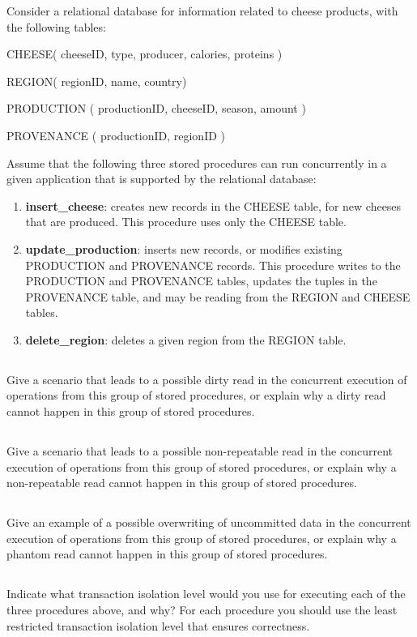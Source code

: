 {\color{gray}Consider a relational database for information related to cheese products, with the following tables:

\tab CHEESE( cheeseID, type, producer, calories, proteins )

\tab REGION( regionID, name, country)

\tab PRODUCTION ( productionID, cheeseID, season, amount )

\tab PROVENANCE ( productionID, regionID )

Assume that the following three stored procedures can run concurrently in a given application that is supported by the relational database:
\begin{enumerate}

	\item \textbf{insert\_cheese}: creates new records in the CHEESE table, for new cheeses that are produced. This procedure uses only the CHEESE table.

	\item \textbf{update\_production}: inserts new records, or modifies existing PRODUCTION and PROVENANCE records. This procedure writes to the PRODUCTION and PROVENANCE tables, updates the tuples in the PROVENANCE table, and may be reading from the REGION and CHEESE tables.

	\item \textbf{delete\_region}: deletes a given region from the REGION table.

\end{enumerate}
}

\subsection{}
{\color{gray}Give a scenario that leads to a possible dirty read in the concurrent execution of operations from this group of stored procedures, or explain why a dirty read cannot happen in this group of stored procedures.}

\subsection{}
{\color{gray}Give a scenario that leads to a possible non-repeatable read in the concurrent execution of operations from this group of stored procedures, or explain why a non-repeatable read cannot happen in this group of stored procedures.}

\subsection{}
{\color{gray}Give an example of a possible overwriting of uncommitted data in the concurrent execution of operations from this group of stored procedures, or explain why a phantom read cannot happen in this group of stored procedures.}

\subsection{}
{\color{gray}Indicate what transaction isolation level would you use for executing each of the three procedures above, and why? For each procedure you should use the least restricted transaction isolation level that ensures correctness.}
